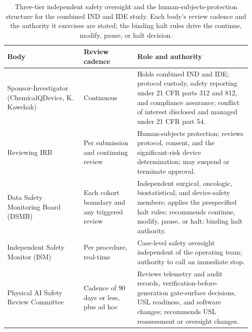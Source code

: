 \begin{table}[htbp]
\centering
\footnotesize
\caption{Three-tier independent safety oversight and the human-subjects-protection
structure for the combined IND and IDE study. Each body's review cadence and the
authority it exercises are stated; the binding halt rules drive the continue,
modify, pause, or halt decision.}
\label{tab:oversight-bodies}
\begin{tabularx}{\textwidth}{L{3.4cm} L{3.2cm} Y}
\toprule
\textbf{Body} & \textbf{Review cadence} & \textbf{Role and authority} \\
\midrule
Sponsor-Investigator (ChemicalQDevice, K. Kawchak) & Continuous & Holds combined IND and IDE; protocol custody, safety reporting under 21 CFR parts 312 and 812, and compliance assurance; conflict of interest disclosed and managed under 21 CFR part 54. \\
Reviewing IRB & Per submission and continuing review & Human-subjects protection; reviews protocol, consent, and the significant-risk device determination; may suspend or terminate approval. \\
Data Safety Monitoring Board (DSMB) & Each cohort boundary and any triggered review & Independent surgical, oncologic, biostatistical, and device-safety members; applies the prespecified halt rules; recommends continue, modify, pause, or halt; binding halt authority. \\
Independent Safety Monitor (ISM) & Per procedure, real-time & Case-level safety oversight independent of the operating team; authority to call an immediate stop. \\
Physical AI Safety Review Committee & Cadence of 90 days or less, plus ad hoc & Reviews telemetry and audit records, verification-before-generation gate-surface decisions, USL readiness, and software changes; recommends USL reassessment or oversight changes. \\
\bottomrule
\end{tabularx}
\end{table}


